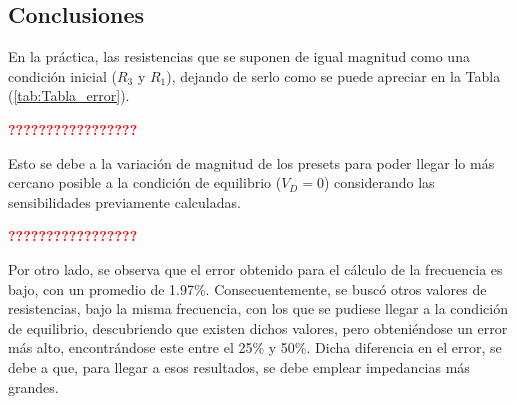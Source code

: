 \subsection{Conclusiones}

En la práctica, las resistencias que se suponen de igual magnitud como una condición inicial ($R_3$ y $R_1$), dejando de serlo como se puede apreciar en la Tabla (\ref{tab:Tabla_error}).
\begin{center}
	\huge{\textcolor{red}{\textbf{?????????????????}}}
\end{center}
Esto se debe a la variación de magnitud de los presets para poder llegar lo más cercano posible a la condición de equilibrio ($V_D=0$) considerando las sensibilidades previamente calculadas.
\begin{center}
	\huge{\textcolor{red}{\textbf{?????????????????}}}
\end{center}
Por otro lado, se observa que el error obtenido para el cálculo de la frecuencia es bajo, con un promedio de 1.97\%. Consecuentemente, se buscó otros valores de resistencias, bajo la misma frecuencia, con los que se pudiese llegar a la condición de equilibrio, descubriendo que existen dichos valores, pero obteniéndose un error más alto, encontrándose este entre el 25\% y 50\%. Dicha diferencia en el error, se debe a que, para llegar a esos resultados, se debe emplear impedancias más grandes.

